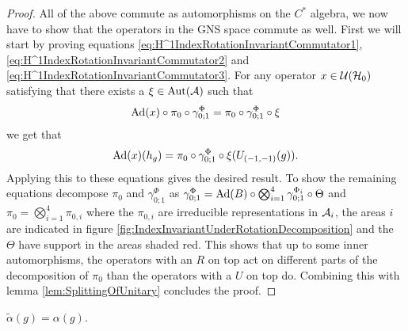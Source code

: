 \documentclass[11pt,a4paper,twoside]{article}
\numberwithin{equation}{section}
\begin{document}
	\begin{proof}
		All of the above commute as automorphisms on the $C^*$ algebra, we now have to show that the operators in the GNS space commute as well. First we will start by proving equations \eqref{eq:H^1IndexRotationInvariantCommutator1}, \eqref{eq:H^1IndexRotationInvariantCommutator2} and \eqref{eq:H^1IndexRotationInvariantCommutator3}. For any operator $x\in\UU(\HH_0)$ satisfying that there exists a $\xi\in\Aut{\AA}$ such that
		\begin{equation}
			\Ad{x}\circ\pi_0\circ\gamma^{\Phi}_{0;1}=\pi_0\circ\gamma^{\Phi}_{0;1}\circ\xi
		\end{equation}
		we get that
		\begin{equation}
			\Ad{x}(h_g)=\pi_0\circ\gamma^\Phi_{0;1}\circ\xi(U_{(-1,-1)}(g)).
		\end{equation}
		Applying this to these equations gives the desired result. To show the remaining equations decompose $\pi_0$ and $\gamma^\Phi_{0;1}$ as $\gamma^\Phi_{0;1}=\Ad{B}\circ\bigotimes_{i=1}^4\gamma^{\Phi_i}_{0;1}\circ\Theta$ and $\pi_0=\bigotimes_{i=1}^4\pi_{0,i}$ where the $\pi_{0,i}$ are irreducible representations in $\AA_i$, the areas $i$ are indicated in figure \ref{fig:IndexInvariantUnderRotationDecomposition} and the $\Theta$ have support in the areas shaded red. This shows that up to some inner automorphisms, the operators with an $R$ on top act on different parts of the decomposition of $\pi_0$ than the operators with a $U$ on top do. Combining this with lemma \ref{lem:SplittingOfUnitary} concludes the proof.
	\end{proof}
	\begin{lemma}
		$\tilde{\alpha}(g)=\alpha(g)$.
	\end{lemma}
\end{document}
